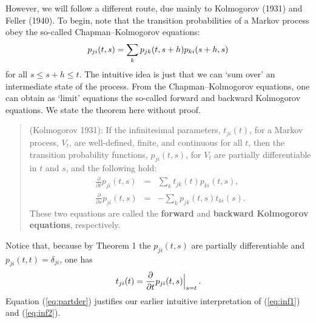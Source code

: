 \documentclass[12pt]{article}
\newcommand{\be}{\vspace*{6pt} \begin{equation}}
\newcommand{\ee}{\vspace*{10pt} \end{equation}}
\begin{document}
However, we will follow a different route, due mainly to Kolmogorov
(1931) and Feller (1940).  To begin, note that the transition
probabilities of a Markov process obey the so-called
Chapman--Kolmogorov equations:
\be
\label{eq:ChapKol}
p_{ji}(t,s) = \sum_{k} p_{jk}(t,s+h) p_{ki}(s+h,s)
\ee
for all $s \leq s+h \leq t$.  The intuitive idea is just that we can
`sum over' an intermediate state of the process.  From the
Chapman--Kolmogorov equations, one can obtain as `limit' equations the
so-called forward and backward Kolmogorov equations.  We state the
theorem here without proof.
\begin{quotation}
 (Kolmogorov 1931): If the infinitesimal
parameters, $t_{ji}(t)$, for a Markov process, $V_{t}$, are
well-defined, finite, and continuous for all $t$, then the transition
probability functions, $p_{ji}(t,s)$, for $V_{t}$ are partially
differentiable in $t$ and $s$, and the following hold:
\begin{eqnarray}
\label{eq:forKol}
\frac{\partial}{\partial t}p_{ji}(t,s)   & = &  \sum_k
t_{jk}(t)p_{ki}(t,s), \\[3ex]
\label{eq:backKol}
\frac{\partial}{\partial s}p_{ji}(t,s)  & = &  -\sum_k p_{jk}(t,s)t_{ki}(s).
\end{eqnarray}
\noindent These two equations are called the {\bf forward} and {\bf
backward Kolmogorov equations}, respectively.
\end{quotation}
\noindent Notice that, because by Theorem 1 the $p_{ji}(t,s)$ are
partially differentiable and $p_{ji}(t,t) = \delta_{ji}$, one has
\be
\label{eq:partder}
t_{ji}(t)=\frac{\partial}{\partial t}p_{ji}(t,s)\Big\vert_{s=t}\,.
\ee
Equation (\ref{eq:partder}) justifies our earlier intuitive
interpretation of (\ref{eq:inf1}) and (\ref{eq:inf2}).
\end{document}
